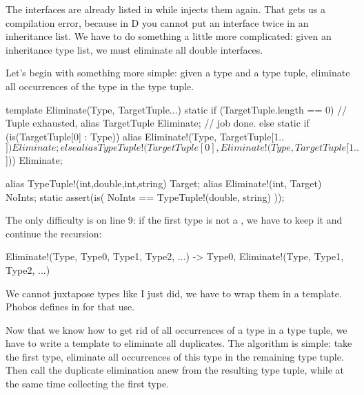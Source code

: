 The interfaces are already listed in  while  injects them again. That gets us a compilation error, because in D you cannot put an interface twice in an inheritance list. We have to do something a little more complicated: given an inheritance type list, we must eliminate all double interfaces.

Let's begin with something more simple: given a type and a type tuple, eliminate all occurrences of the type in the type tuple.

\begin{dcode}
template Eliminate(Type, TargetTuple...)
{
    static if (TargetTuple.length == 0) // Tuple exhausted,
        alias TargetTuple Eliminate;    // job done.
    else static if (is(TargetTuple[0] : Type))
        alias Eliminate!(Type, TargetTuple[1..$]) Eliminate;
    else
        alias 
TypeTuple!(TargetTuple[0], Eliminate!(Type, TargetTuple[1..$])) Eliminate;
}

alias TypeTuple!(int,double,int,string) Target;
alias Eliminate!(int, Target) NoInts;
static assert(is( NoInts == TypeTuple!(double, string) ));
\end{dcode}

The only difficulty is on line 9: if the first type is not a , we have to keep it and continue the recursion:

\begin{dcode}
Eliminate!(Type,  Type0, Type1, Type2, ...)
->
Type0, Eliminate!(Type,  Type1, Type2, ...)
\end{dcode}

We cannot juxtapose types like I just did, we have to wrap them in a template. Phobos defines  in  for that use.

Now that we know how to get rid of all occurrences of a type in a type tuple, we have to write a template to eliminate all duplicates. The algorithm is simple: take the first type, eliminate all occurrences of this type in the remaining type tuple. Then call the duplicate elimination anew from the resulting type tuple, while at the same time collecting the first type.


